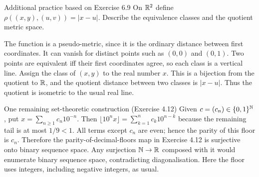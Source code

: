 \begin{exam}{Additional practice based on Exercise 6.9}
On $\mathbb R^2$ define $\rho((x,y),(u,v))=|x-u|$. Describe the equivalence classes and the quotient metric space.
\end{exam}
\begin{answer}
The function is a pseudo-metric, since it is the ordinary distance between first coordinates. It can vanish for distinct points such as $(0,0)$ and $(0,1)$. Two points are equivalent iff their first coordinates agree, so each class is a vertical line. Assign the class of $(x,y)$ to the real number $x$. This is a bijection from the quotient to $\mathbb R$, and the quotient distance between two classes is $|x-u|$. Thus the quotient is isometric to the usual real line.
\end{answer}
\begin{note}{One remaining set-theoretic construction (Exercise 4.12)}
Given $c=(c_n)\in\{0,1\}^{\mathbb N}$, put $x=\sum_{n\ge1}c_n10^{-n}$. Then $\lfloor10^nx\rfloor=\sum_{k=1}^nc_k10^{n-k}$ because the remaining tail is at most $1/9<1$. All terms except $c_n$ are even; hence the parity of this floor is $c_n$. Therefore the parity-of-decimal-floors map in Exercise 4.12 is surjective onto binary sequence space. Any surjection $\mathbb N\to\mathbb R$ composed with it would enumerate binary sequence space, contradicting diagonalisation. Here the floor uses integers, including negative integers, as usual.
\end{note}


